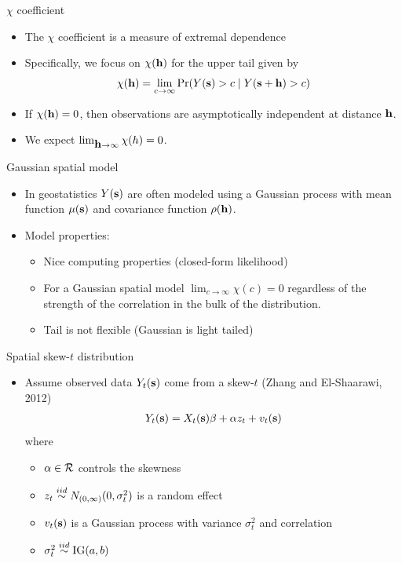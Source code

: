 \documentclass{beamer}
\begin{document}
\begin{frame}{$\chi$ coefficient}
  \begin{itemize} \setlength{\itemsep}{0.5em}
   \item The $\chi$ coefficient is a measure of extremal dependence
   \item Specifically, we focus on $\chi(\mbox{\bf h})$ for the upper tail given by
    \begin{align*}
      \chi(\mbox{\bf h}) = \lim_{c \rightarrow \infty}\Pr(Y(\mbox{\bf s}) > c \mid Y(\mbox{\bf s} + \mbox{\bf h}) > c)
    \end{align*}
    \item If $ \chi(\mbox{\bf h}) = 0$, then observations are asymptotically independent at distance $\mbox{\bf h}$.
    \item We expect $\lim_{\mbox{\bf h} \rightarrow \infty}\chi(h)=0$.
  \end{itemize}
\end{frame}

\begin{frame}{Gaussian spatial model}
  \begin{itemize} \setlength{\itemsep}{0.5em}
    \item In geostatistics $Y(\mbox{\bf s})$ are often modeled using a Gaussian process with mean function $\mu(\mbox{\bf s})$ and covariance function
$\rho(\mbox{\bf h})$.
    \item Model properties:
    \begin{itemize}
      \item Nice computing properties (closed-form likelihood)
    \item For a Gaussian spatial model $\lim_{c \rightarrow \infty} \chi(c) = 0$ regardless of the strength of the correlation in the bulk of the distribution.
    \item Tail is not flexible (Gaussian is light tailed)
    \end{itemize}
    \end{itemize}
\end{frame}

\begin{frame}{Spatial skew-$t$ distribution}
  \begin{itemize} \setlength{\itemsep}{0.5em}
    \item Assume observed data $Y_t(\mbox{\bf s})$ come from a skew-$t$ (Zhang and El-Shaarawi, 2012)
    \begin{align*}
      Y_t(\mbox{\bf s}) = X_t(\mbox{\bf s})\beta + \alpha z_t + v_t(\mbox{\bf s})
    \end{align*}
    where
    \begin{itemize} \setlength{\itemsep}{0.25em}
      \item $\alpha \in {\cal R}$ controls the skewness
      \item $z_t \stackrel{iid}{\sim} N_{(0, \infty)}(0, \sigma^2_t)$ is a random effect
      \item $v_t(\mbox{\bf s})$ is a Gaussian process with variance $\sigma^2_t$ and \Matern correlation
      \item $\sigma_t^2 \stackrel{iid}{\sim} \text{IG}(a, b)$
    \end{itemize}
  \end{itemize}
\end{frame}
\end{document}
